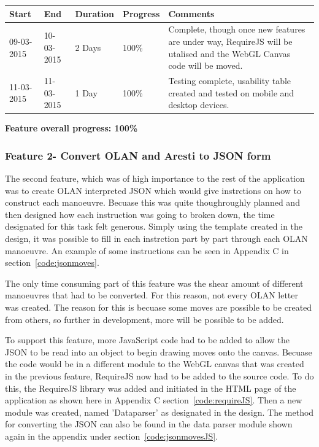 \begin{table}[h]
\begin{tabular}{|l|l|l|l|p{7cm}|}
\hline
\textbf{Start} & \textbf{End} & \textbf{Duration} & \textbf{Progress} & \textbf{Comments}                                                                                                     \\ \hline
09-03-2015     & 10-03-2015   & 2 Days            & 100\%             & Complete, though once new features are under way, RequireJS will be utalised and the WebGL Canvas code will be moved. \\ \hline
11-03-2015     & 11-03-2015   & 1 Day            & 100\%             & Testing complete, usability table created and tested on mobile and desktop devices.\\ \hline
\end{tabular}
\end{table}

\textbf{Feature overall progress: 100\%}

\subsubsection{Feature 2- Convert OLAN and Aresti to JSON form}
The second feature, which was of high importance to the rest of the application was to create OLAN interpreted JSON which would give instrctions on how to construct each manoeuvre. Becuase this was quite thoughroughly planned and then designed how each instruction was going to broken down, the time designated for this task felt generous. Simply using the template created in the design, it was possible to fill in each instrction part by part through each OLAN manoeuvre. An example of some instructions can be seen in Appendix C in section~\ref{code:jsonmoves}.

The only time consuming part of this feature was the shear amount of different manoeuvres that had to be converted. For this reason, not every OLAN letter was created. The reason for this is becuase some moves are possible to be created from others, so further in development, more will be possible to be added. 

To support this feature, more JavaScript code had to be added to allow the JSON to be read into an object to begin drawing moves onto the canvas. Becuase the code would be in a different module to the WebGL canvas that was created in the previous feature, RequireJS now had to be added to the source code. To do this, the RequireJS library was added and initiated in the HTML page of the application as shown here in Appendix C section~\ref{code:requireJS}. Then a new module was created, named 'Dataparser' as designated in the design. The method for converting the JSON can also be found in the data parser module shown again in the appendix under section~\ref{code:jsonmovesJS}.

